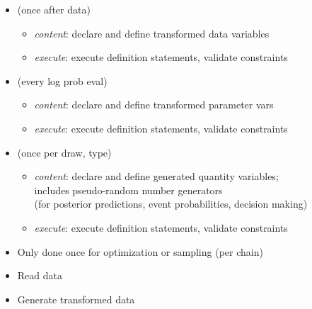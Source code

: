 \documentclass[10pt]{report}
\begin{document}
%
\begin{itemize}
\item {} (once after data)
  \vspace*{-4pt}
  \begin{itemize}\small
  \item {\slshape content}: declare and define transformed data variables
  \item {\slshape execute}: execute definition statements, validate constraints
  \end{itemize}
\item {} (every log prob eval)
  \vspace*{-4pt}
  \begin{itemize}\small
  \item {\slshape content}: declare and define transformed parameter vars
  \item {\slshape execute}: execute definition statements, validate constraints
  \end{itemize}
\item {} (once per draw, 
   type)
  \vspace*{-4pt}
  \begin{itemize}\small
  \item {\slshape content}: declare and define generated quantity
    variables; \\
    includes pseudo-random number generators
    \\
    {\footnotesize (for posterior predictions, event probabilities,
      decision making)}
  \item {\slshape execute}: execute definition statements, validate constraints
  \end{itemize}
\end{itemize}


%
\begin{itemize}
\item Only done once for optimization or sampling (per chain)
\item Read data
\item Generate transformed data
\end{itemize}
\end{document}
